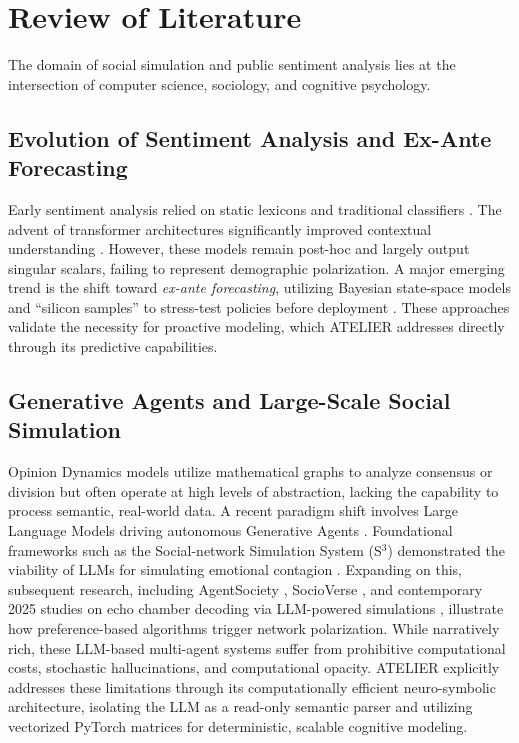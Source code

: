 \documentclass[12pt]{IEEEtran}
\begin{document}
\section{Review of Literature}
\label{sec:literature}

The domain of social simulation and public sentiment analysis lies at the intersection of computer science, sociology, and cognitive psychology.

\subsection{Evolution of Sentiment Analysis and Ex-Ante Forecasting}
Early sentiment analysis relied on static lexicons and traditional classifiers \cite{yadollahi2016review}. The advent of transformer architectures significantly improved contextual understanding \cite{kummervold2022}. However, these models remain post-hoc and largely output singular scalars, failing to represent demographic polarization. A major emerging trend is the shift toward \textit{ex-ante forecasting}, utilizing Bayesian state-space models and ``silicon samples'' to stress-test policies before deployment \cite{cho2025bayesian, nus2026silicon}. These approaches validate the necessity for proactive modeling, which ATELIER addresses directly through its predictive capabilities.

\subsection{Generative Agents and Large-Scale Social Simulation}
Opinion Dynamics models \cite{castellano2009statistical, li2017multi} utilize mathematical graphs to analyze consensus or division but often operate at high levels of abstraction, lacking the capability to process semantic, real-world data. A recent paradigm shift involves Large Language Models driving autonomous Generative Agents \cite{park2023generative}. Foundational frameworks such as the Social-network Simulation System (S$^3$) demonstrated the viability of LLMs for simulating emotional contagion \cite{gao2023s3}. Expanding on this, subsequent research, including AgentSociety \cite{park2023agentsociety}, SocioVerse \cite{wang2024sociocognitive}, and contemporary 2025 studies on echo chamber decoding via LLM-powered simulations \cite{chen2025decoding}, illustrate how preference-based algorithms trigger network polarization. While narratively rich, these LLM-based multi-agent systems suffer from prohibitive computational costs, stochastic hallucinations, and computational opacity. ATELIER explicitly addresses these limitations through its computationally efficient neuro-symbolic architecture, isolating the LLM as a read-only semantic parser and utilizing vectorized PyTorch matrices for deterministic, scalable cognitive modeling.
\end{document}
